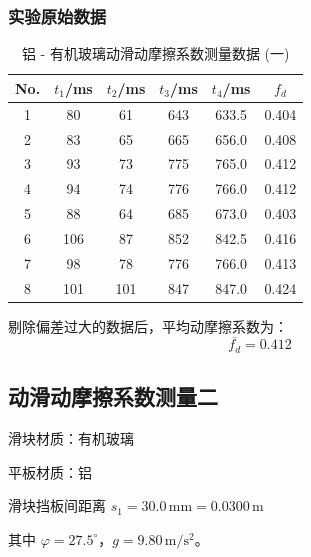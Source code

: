\subsubsection{实验原始数据}
\begin{table}[h!]
    \centering
    \renewcommand{\arraystretch}{1.5}
    \setlength{\tabcolsep}{8pt}
    \begin{tabular}{|c|c|c|c|c|c|}
    \hline
    \textbf{No.} & $t_1$/ms & $t_2$/ms & $t_3$/ms & $t_4$/ms & $f_d$ \\ \hline
    1 & 80 & 61 & 643 & 633.5 & 0.404 \\ \hline
    2 & 83 & 65 & 665 & 656.0 & 0.408 \\ \hline
    3 & 93 & 73 & 775 & 765.0 & 0.412 \\ \hline
    4 & 94 & 74 & 776 & 766.0 & 0.412 \\ \hline
    5 & 88 & 64 & 685 & 673.0 & 0.403 \\ \hline
    6 & 106 & 87 & 852 & 842.5 & 0.416 \\ \hline
    7 & 98 & 78 & 776 & 766.0 & 0.413 \\ \hline
    8 & 101 & 101 & 847 & 847.0 & 0.424 \\ \hline
    \end{tabular}
    \caption{铝 - 有机玻璃动滑动摩擦系数测量数据 (一)}
    \label{tab:dynamic_friction_data}
\end{table}

剔除偏差过大的数据后，平均动摩擦系数为：
$$
\overline{f_d} = 0.412
$$

\subsection{动滑动摩擦系数测量二}

滑块材质：有机玻璃

平板材质：铝

滑块挡板间距离 $s_1=30.0\,\mathrm{mm}=0.0300\,\mathrm{m}$

其中 $\varphi=27.5^\circ$，$g=9.80\,\mathrm{m/s^2}$。


